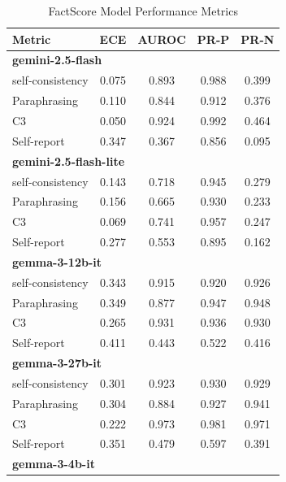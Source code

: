 \documentclass[11pt]{article}
\theoremstyle{plain}
\theoremstyle{definition}
\theoremstyle{remark}
\begin{document}
\begin{table}[p]
\centering
\caption{FactScore Model Performance Metrics}
\label{tab:factscore-metrics}
\scriptsize
\begin{minipage}[t]{0.48\textwidth}
    \centering
    \begin{tabular}{lcccc}
        \toprule
        \textbf{Metric} & \textbf{ECE} & \textbf{AUROC} & \textbf{PR-P} & \textbf{PR-N} \\
        \midrule
        \multicolumn{5}{l}{\textbf{gemini-2.5-flash}} \\
        self-consistency & 0.075 & 0.893 & 0.988 & 0.399 \\
        Paraphrasing     & 0.110 & 0.844 & 0.912 & 0.376 \\
       C3             & 0.050 & 0.924 & 0.992 & 0.464 \\
        Self-report      & 0.347 & 0.367 & 0.856 & 0.095 \\
        \midrule
        \multicolumn{5}{l}{\textbf{gemini-2.5-flash-lite}} \\
        self-consistency & 0.143 & 0.718 & 0.945 & 0.279 \\
        Paraphrasing     & 0.156 & 0.665 & 0.930 & 0.233 \\
       C3             & 0.069 & 0.741 & 0.957 & 0.247 \\
        Self-report      & 0.277 & 0.553 & 0.895 & 0.162 \\
        \midrule
        \multicolumn{5}{l}{\textbf{gemma-3-12b-it}} \\
        self-consistency & 0.343 & 0.915 & 0.920 & 0.926 \\
        Paraphrasing     & 0.349 & 0.877 & 0.947 & 0.948 \\
       C3             & 0.265 & 0.931 & 0.936 & 0.930 \\
        Self-report      & 0.411 & 0.443 & 0.522 & 0.416 \\
        \midrule
        \multicolumn{5}{l}{\textbf{gemma-3-27b-it}} \\
        self-consistency & 0.301 & 0.923 & 0.930 & 0.929 \\
        Paraphrasing     & 0.304 & 0.884 & 0.927 & 0.941 \\
       C3             & 0.222 & 0.973 & 0.981 & 0.971 \\
        Self-report      & 0.351 & 0.479 & 0.597 & 0.391 \\
        \midrule
        \multicolumn{5}{l}{\textbf{gemma-3-4b-it}} \\

\end{tabular}
\end{minipage}
\end{table}
\end{document}

